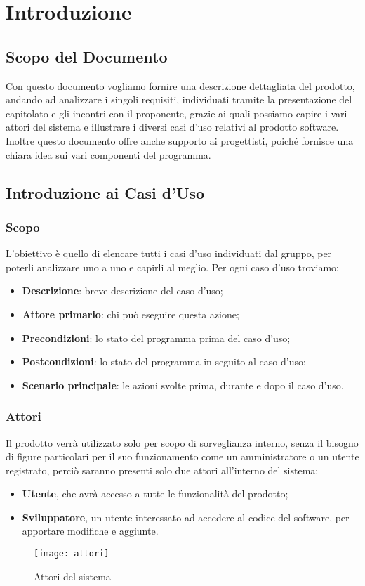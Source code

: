\chapter{Introduzione}

\section{Scopo del Documento}
Con questo documento vogliamo fornire una descrizione dettagliata del prodotto, andando ad analizzare i singoli
requisiti, individuati tramite la presentazione del capitolato e gli incontri con il proponente, grazie ai quali
possiamo capire i vari attori del sistema e illustrare i diversi casi d'uso relativi al prodotto software.
\newline
Inoltre questo documento offre anche supporto ai progettisti, poiché fornisce una chiara idea sui vari componenti del programma.

\section{Introduzione ai Casi d'Uso}
\subsection{Scopo}
L'obiettivo è quello di elencare tutti i casi d'uso individuati dal gruppo, per poterli analizzare uno a uno e capirli al meglio.
\newline
Per ogni caso d'uso troviamo:
\begin{itemize}
  \item \textbf{Descrizione}: breve descrizione del caso d'uso;
  \item \textbf{Attore primario}: chi può eseguire questa azione;
  \item \textbf{Precondizioni}: lo stato del programma prima del caso d'uso;
  \item \textbf{Postcondizioni}: lo stato del programma in seguito al caso d'uso;
  \item \textbf{Scenario principale}: le azioni svolte prima, durante e dopo il caso d'uso.
\end{itemize}

\subsection{Attori}
Il prodotto verrà utilizzato solo per scopo di sorveglianza interno, senza il bisogno di figure particolari per il suo funzionamento
come un amministratore o un utente registrato, perciò saranno presenti solo due attori all'interno del sistema:
\begin{itemize}
  \item \textbf{Utente}, che avrà accesso a tutte le funzionalità del prodotto;
  \item \textbf{Sviluppatore}, un utente interessato ad accedere al codice del software, per apportare modifiche e aggiunte.
\end{itemize} 
\begin{figure}[ht]
  \centering
  \texttt{[image: attori]}
  \caption{Attori del sistema}
\end{figure}

